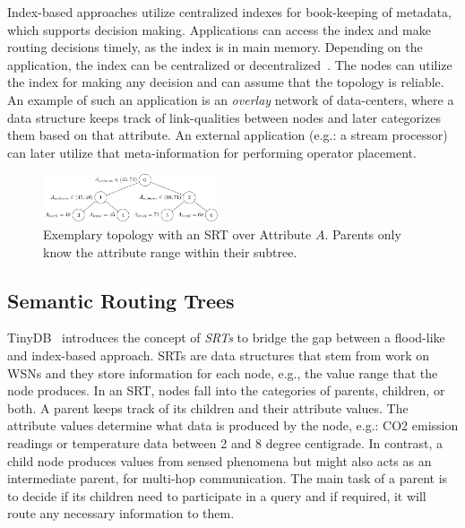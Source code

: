 Index-based approaches utilize centralized indexes for book-keeping of metadata, which supports decision making. 
Applications can access the index and make routing decisions timely, as the index is in main memory. Depending on the application, the index can be centralized or decentralized~\cite{muhl2006distributed}. 
The nodes can utilize the index for making any decision and can assume that the topology is reliable. 
An example of such an application is an \textit{overlay} network of data-centers, where a data structure keeps track of link-qualities between nodes and later categorizes them based on that attribute. 
An external application (e.g.: a stream processor) can later utilize that meta-information for performing operator placement.
%
\begin{figure}[t]
  \includegraphics[width=0.46\textwidth]{img/vliot-basic-srt/vliot-basic-srt.pdf}
  \caption{Exemplary topology with an SRT over Attribute $A$. Parents only know the attribute range within their subtree.}
  \label{fig:basic-srt}
\end{figure}
%

\subsection{Semantic Routing Trees} 
\label{subsec::srt}
% 
TinyDB~\cite{madden2005tinydb} introduces the concept of \textit{SRTs} to bridge the gap between a flood-like and index-based approach.
% 
SRTs are data structures that stem from work on WSNs and they store information for each node, e.g., the value range that the node produces. In an SRT, nodes fall into the categories of parents, children, or both. A parent keeps track of its children and their attribute values. The attribute values determine what data is produced by the node, e.g.: CO2 emission readings or temperature data between 2 and 8 degree centigrade. In contrast, a child node produces values from sensed phenomena but might also acts as an intermediate parent, for multi-hop communication. The main task of a parent is to decide if its children need to participate in a query and if required, it will route any necessary information to them.


